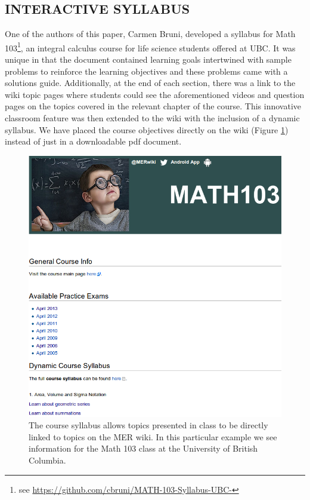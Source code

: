 \documentclass{primus}
\begin{document}
\subsection{INTERACTIVE SYLLABUS}\label{sec:Interactive_Syllabus}
One of the authors of this paper, Carmen Bruni, developed a syllabus for Math 103\footnote{see \url{https://github.com/cbruni/MATH-103-Syllabus-UBC-}}, an integral calculus course for life science students offered at UBC. It was unique in that the document contained learning goals intertwined with sample problems to reinforce the learning objectives and these problems came with a solutions guide. Additionally, at the end of each section, there was a link to the wiki topic pages where students could see the aforementioned videos and question pages on the topics covered in the relevant chapter of the course. 
This innovative classroom feature was then extended to the wiki with the inclusion of a dynamic syllabus.  We have placed the course objectives directly on the wiki (Figure \ref{fig:Syllabus_Math103}) instead of just in a downloadable pdf document.

\begin{figure}[H]
\centering
\includegraphics[width=\textwidth]{figs/Syllabus_Math103.png}
\caption{The course syllabus allows topics presented in class to be directly linked to topics on the MER wiki.  In this particular example we see information for the Math 103 class at the University of British Columbia.}\label{fig:Syllabus_Math103}
\end{figure}
\end{document}
